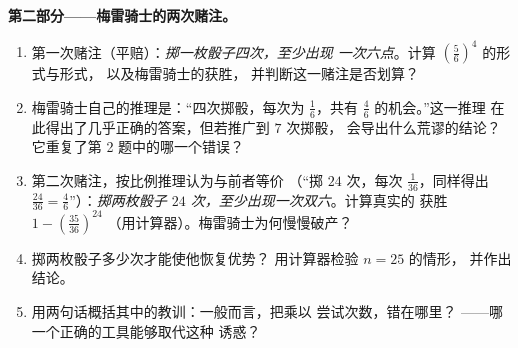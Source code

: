 \begin{problem}
\medskip
\noindent\textbf{第二部分——梅雷骑士的两次赌注。}
\begin{enumerate}[resume]
  \item 第一次赌注（平赔）：\emph{掷一枚骰子四次，至少出现
        一次六点}。计算
        $\left(\frac56\right)^4$ 的形式与形式，
        以及梅雷骑士的获胜，
        并判断这一赌注是否划算？
  \item 梅雷骑士自己的推理是：“四次掷骰，每次为
        $\frac16$，共有 $\frac46$ 的机会。”这一推理
        在此得出了几乎正确的答案，但若推广到 $7$ 次掷骰，
        会导出什么荒谬的结论？它重复了第 2
        题中的哪一个错误？
  \item 第二次赌注，按比例推理认为与前者等价
        （“掷 $24$ 次，每次 $\frac1{36}$，同样得出
        $\frac{24}{36} = \frac46$”）：\emph{掷两枚骰子
        $24$ 次，至少出现一次双六}。计算真实的
        获胜 $1 - \left(\frac{35}{36}\right)^{24}$
        （用计算器）。梅雷骑士为何慢慢破产？
  \item 掷两枚骰子多少次才能使他恢复优势？
        用计算器检验 $n = 25$ 的情形，
        并作出结论。
  \item 用两句话概括其中的教训：一般而言，把乘以
        尝试次数，错在哪里？
        ——哪一个正确的工具能够取代这种
        诱惑？
\end{enumerate}


\end{problem}
